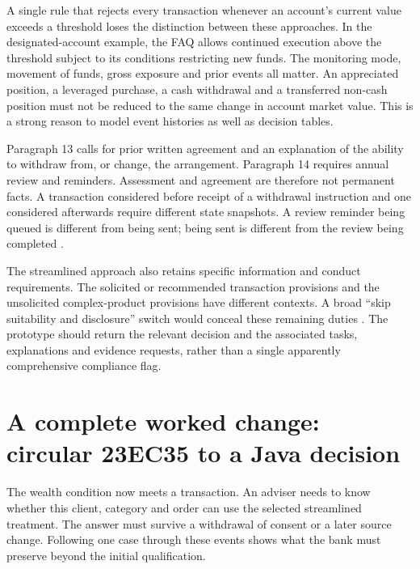 A single rule that rejects every transaction whenever an account's current value
exceeds a threshold loses the distinction between these approaches. In the
designated-account example, the FAQ allows continued execution above the
threshold subject to its conditions restricting new funds. The monitoring mode,
movement of funds, gross exposure and prior events all matter. An appreciated
position, a leveraged purchase, a cash withdrawal and a transferred non-cash
position must not be reduced to the same change in account market value. This is
a strong reason to model event histories as well as decision tables.


Paragraph 13 calls for prior written agreement and an explanation of the ability
to withdraw from, or change, the arrangement. Paragraph 14 requires annual review
and reminders. Assessment and agreement are therefore not permanent facts. A
transaction considered before receipt of a withdrawal instruction and one
considered afterwards require different state snapshots. A review reminder being
queued is different from being sent; being sent is different from the review
being completed \citep[Annex 1, paras.~12--14]{sfcspiannex1}.

The streamlined approach also retains specific information and conduct
requirements. The solicited or recommended transaction provisions and the
unsolicited complex-product provisions have different contexts. A broad
``skip suitability and disclosure'' switch would conceal these remaining duties
\citep[Annex 1, paras.~9--11]{sfcspiannex1}. The prototype should return the
relevant decision and the associated tasks, explanations and evidence requests,
rather than a single apparently comprehensive compliance flag.

\section{A complete worked change: circular 23EC35 to a Java decision}

The wealth condition now meets a transaction. An adviser needs to know whether
this client, category and order can use the selected streamlined treatment. The
answer must survive a withdrawal of consent or a later source change. Following
one case through these events shows what the bank must preserve beyond the
initial qualification.

